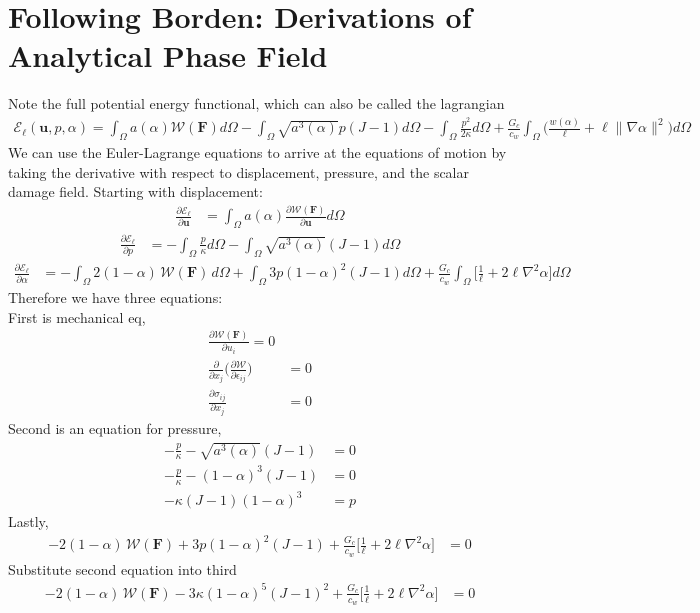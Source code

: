 \documentclass[12pt,3p]{article}
\numberwithin{equation}{section}
\begin{document}
\section{Following Borden: Derivations of Analytical Phase Field}
Note the full potential energy functional, which can also be called the lagrangian
\begin{align*}
\mathcal{E}_{\ell} (\boldsymbol{u}, p, \alpha) = \int_{\Omega} a(\alpha) \mathcal{W}(\mathbf{F}) d \Omega - \int_{\Omega} \sqrt{a^{3}(\alpha)} p(J-1) d \Omega - \int_{\Omega} \frac{p^{2}}{2 \kappa} d \Omega + \frac{G_{c}}{c_{w}} \int_{\Omega} \bigg(\frac{w(\alpha)}{\ell}+\ell\|\nabla \alpha\|^{2} \bigg) d \Omega
\end{align*}
We can use the Euler-Lagrange equations to arrive at the equations of motion by taking the derivative with respect to displacement, pressure, and the scalar damage field. Starting with displacement:
\begin{align*}
\frac{\partial \mathcal{E}_{\ell}}{\partial \boldsymbol{u}} &= \int_{\Omega} a (\alpha) \frac{\partial \mathcal{W} (\mathbf{F})}{\partial \mathbf{u}} d \Omega 
\end{align*}
\begin{align*}
\frac{\partial \mathcal{E}_{\ell}}{\partial p} &= - \int_{\Omega} \frac{p}{\kappa} d \Omega - \int_{\Omega} \sqrt{a^3(\alpha)} (J-1) d \Omega
\end{align*}
\begin{align*}
\frac{\partial \mathcal{E}_{\ell}}{\partial \alpha} &= - \int_{\Omega} 2 (1 - \alpha) \, \mathcal{W} (\mathbf{F}) \, d \Omega + \int_{\Omega} 3 p (1- \alpha)^2 (J-1) d \Omega + \frac{G_{c}}{c_{w}} \int_{\Omega} \bigg[ \frac{1}{\ell} + 2 \ell \nabla^2 \alpha \bigg] d \Omega 
\end{align*}
Therefore we have three equations: \\
First is mechanical eq,
\begin{align*}
\frac{\partial \mathcal{W} (\mathbf{F})}{\partial u_i} = 0 \\
\frac{\partial}{\partial x_j} \bigg( \frac{\partial \mathcal{W}}{\partial \epsilon_{ij}} \bigg) &= 0 \\
\frac{\partial \sigma_{ij}}{\partial x_j} &= 0 
\end{align*}
Second is an equation for pressure, 
\begin{align*}
-\frac{p}{\kappa} - \sqrt{a^3(\alpha)} (J-1) &= 0 \\
-\frac{p}{\kappa} - (1-\alpha)^3 (J-1) &= 0 \\
- \kappa (J-1)(1-\alpha)^3 &= p
\end{align*}
Lastly,
\begin{align*}
- 2 (1 - \alpha) \, \mathcal{W} (\mathbf{F}) + 3 p (1- \alpha)^2 (J-1) + \frac{G_{c}}{c_{w}} \bigg[ \frac{1}{\ell} + 2 \ell \nabla^2 \alpha \bigg] &= 0 
\end{align*}
Substitute second equation into third
\begin{align*}
- 2 (1 - \alpha) \, \mathcal{W} (\mathbf{F}) - 3 \kappa (1-\alpha)^5 (J-1)^2 + \frac{G_{c}}{c_{w}} \bigg[ \frac{1}{\ell} + 2 \ell \nabla^2 \alpha \bigg] &= 0 
\end{align*}
\end{document}
